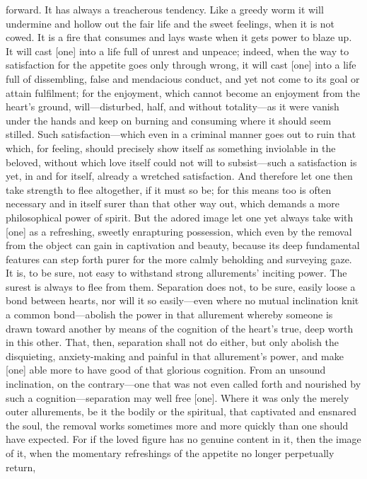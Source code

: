 \documentclass[12pt,a4paper]{book}
\begin{document}
forward. It has always a treacherous tendency. Like a greedy worm it will
undermine and hollow out the fair life and the sweet feelings, when it is
not cowed. It is a fire that consumes and lays waste when it gets power to
blaze up. It will cast [one] into a life full of unrest and unpeace;
indeed, when the way to satisfaction for the appetite goes only through
wrong, it will cast [one] into a life full of dissembling, false and
mendacious conduct, and yet not come to its goal or attain fulfilment; for
the enjoyment, which cannot become an enjoyment from the heart's ground,
will---disturbed, half, and without totality---as it were vanish under the
hands and keep on burning and consuming where it should seem stilled. Such
satisfaction---which even in a criminal manner goes out to ruin that which,
for feeling, should precisely show itself as something inviolable in the
beloved, without which love itself could not will to subsist---such a
satisfaction is yet, in and for itself, already a wretched satisfaction.
And therefore let one then take strength to flee altogether, if it must so
be; for this means too is often necessary and in itself surer than that
other way out, which demands a more philosophical power of spirit. But the
adored image let one yet always take with [one] as a refreshing, sweetly
enrapturing possession, which even by the removal from the object can gain
in captivation and beauty, because its deep fundamental features can step
forth purer for the more calmly beholding and surveying gaze. It is, to be
sure, not easy to withstand strong allurements' inciting power. The surest
is always to flee from them. Separation does not, to be sure, easily loose
a bond between hearts, nor will it so easily---even where no mutual
inclination knit a common bond---abolish the power in that allurement
whereby someone is drawn toward another by means of the cognition of the
heart's true, deep worth in this other. That, then, separation shall not do
either, but only abolish the disquieting, anxiety-making and painful in
that allurement's power, and make [one] able more to have good of that
glorious cognition. From an unsound inclination, on the contrary---one that
was not even called forth and nourished by such a cognition---separation may
well free [one]. Where it was only the merely outer allurements, be it the
bodily or the spiritual, that captivated and ensnared the soul, the removal
works sometimes more and more quickly than one should have expected. For if
the loved figure has no genuine content in it, then the image of it, when
the momentary refreshings of the appetite no longer perpetually return,
\end{document}
